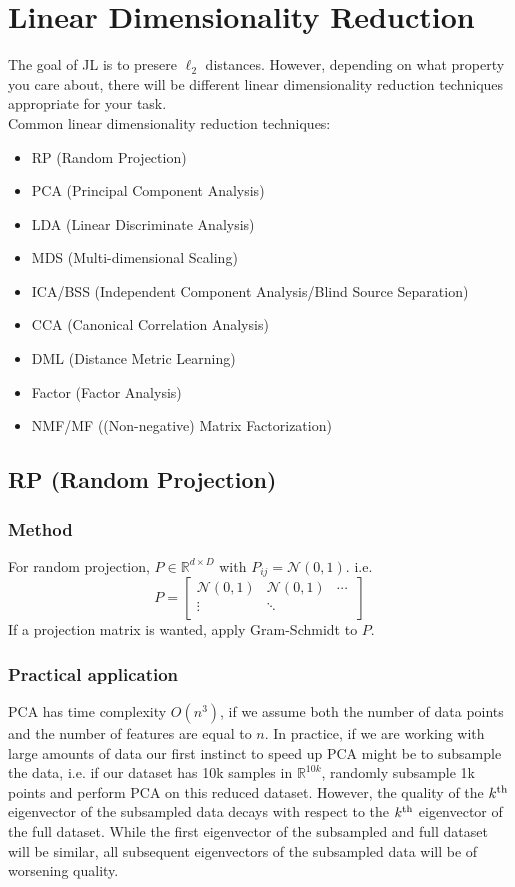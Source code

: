 \section{Linear Dimensionality Reduction}
The goal of JL is to presere $\ell_{2}$ distances. However, depending
on what property you care about, there will be different linear
dimensionality reduction techniques appropriate for your task. \\ 

\noindent Common linear dimensionality reduction techniques:
\begin{itemize}
\item RP (Random Projection)
\item PCA (Principal Component Analysis)
\item LDA (Linear Discriminate Analysis)
\item MDS (Multi-dimensional Scaling)
\item ICA/BSS (Independent Component Analysis/Blind Source Separation)
\item CCA (Canonical Correlation Analysis)
\item DML (Distance Metric Learning)
\item Factor (Factor Analysis)
\item NMF/MF ((Non-negative) Matrix Factorization)
\end{itemize}

\subsection{RP (Random Projection)}
\subsubsection*{Method}
For random projection, $P\in \mathbb{R}^{d\times D}$ with $P_{ij} =
\mathcal{N}(0,1)$. i.e. 
\[
P = 
\begin{bmatrix}
    \mathcal{N}(0,1) & \mathcal{N}(0,1) & \dotsm\ \\
    \vdots & \ddots & \\
\end{bmatrix}
\]
If a projection matrix is wanted, apply Gram-Schmidt to $P$.

\subsubsection{Practical application}
PCA has time complexity $O(n^3)$, if we assume both the number of data
points and the number of features are equal to $n$. In practice, if we
are working with large amounts of data our first instinct to speed up
PCA might be to subsample the data, i.e. if our dataset has 10k
samples in $\mathbb{R}^{10k}$, randomly subsample 1k points and
perform PCA on this reduced dataset. However, the quality of the
$k^{\rm th}$ eigenvector of the subsampled data decays with respect to
the $k^{\rm th}$ eigenvector of the full dataset. While the first
eigenvector of the subsampled and full dataset will be similar, all
subsequent eigenvectors of the subsampled data will be of worsening
quality.  

